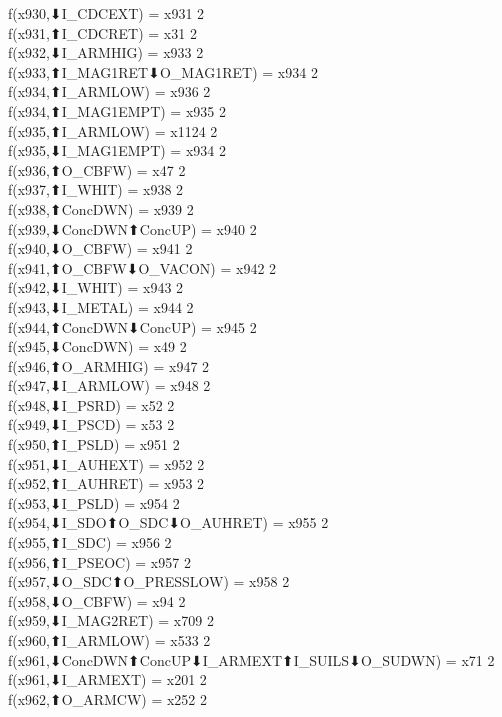 f(x930,⬇I_CDCEXT) = x931 {2} \\
f(x931,⬆I_CDCRET) = x31 {2} \\
f(x932,⬇I_ARMHIG) = x933 {2} \\
f(x933,⬆I_MAG1RET⬇O_MAG1RET) = x934 {2} \\
f(x934,⬆I_ARMLOW) = x936 {2} \\
f(x934,⬆I_MAG1EMPT) = x935 {2} \\
f(x935,⬆I_ARMLOW) = x1124 {2} \\
f(x935,⬇I_MAG1EMPT) = x934 {2} \\
f(x936,⬆O_CBFW) = x47 {2} \\
f(x937,⬆I_WHIT) = x938 {2} \\
f(x938,⬆ConcDWN) = x939 {2} \\
f(x939,⬇ConcDWN⬆ConcUP) = x940 {2} \\
f(x940,⬇O_CBFW) = x941 {2} \\
f(x941,⬆O_CBFW⬇O_VACON) = x942 {2} \\
f(x942,⬇I_WHIT) = x943 {2} \\
f(x943,⬇I_METAL) = x944 {2} \\
f(x944,⬆ConcDWN⬇ConcUP) = x945 {2} \\
f(x945,⬇ConcDWN) = x49 {2} \\
f(x946,⬆O_ARMHIG) = x947 {2} \\
f(x947,⬇I_ARMLOW) = x948 {2} \\
f(x948,⬇I_PSRD) = x52 {2} \\
f(x949,⬇I_PSCD) = x53 {2} \\
f(x950,⬆I_PSLD) = x951 {2} \\
f(x951,⬇I_AUHEXT) = x952 {2} \\
f(x952,⬆I_AUHRET) = x953 {2} \\
f(x953,⬇I_PSLD) = x954 {2} \\
f(x954,⬇I_SDO⬆O_SDC⬇O_AUHRET) = x955 {2} \\
f(x955,⬆I_SDC) = x956 {2} \\
f(x956,⬆I_PSEOC) = x957 {2} \\
f(x957,⬇O_SDC⬆O_PRESSLOW) = x958 {2} \\
f(x958,⬇O_CBFW) = x94 {2} \\
f(x959,⬇I_MAG2RET) = x709 {2} \\
f(x960,⬆I_ARMLOW) = x533 {2} \\
f(x961,⬇ConcDWN⬆ConcUP⬇I_ARMEXT⬆I_SUILS⬇O_SUDWN) = x71 {2} \\
f(x961,⬇I_ARMEXT) = x201 {2} \\
f(x962,⬆O_ARMCW) = x252 {2} \\
